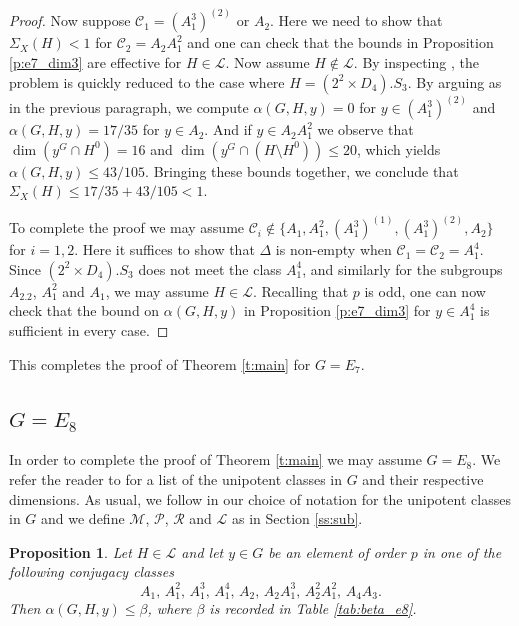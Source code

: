 \documentclass[twoside,a4paper,reqno,11pt]{amsart}
\renewcommand{\a}{\alpha}
\renewcommand{\b}{\beta}
\newcommand{\<}{\langle}
\renewcommand{\>}{\rangle}
\newcommand{\leqs}{\leqslant}
\renewcommand{\:}{\colon}
\theoremstyle{plain}
\newtheorem{prop}[thm]{Proposition}
\theoremstyle{definition}
\begin{document}
\begin{proof}
Now suppose $\mathcal{C}_1 = (A_1^3)^{(2)}$ or $A_2$. Here we need to show that 
$\Sigma_X(H)<1$ for $\mathcal{C}_2 = A_2A_1^2$ and one can check that the bounds in Proposition \ref{p:e7_dim3} are effective for $H \in \mathcal{L}$. Now assume $H \not\in \mathcal{L}$. By inspecting \cite{Law2}, the problem is quickly reduced to the case where $H = (2^2 \times D_4).S_3$. By arguing as in the previous paragraph, we compute $\a(G,H,y) = 0$ for $y \in (A_1^3)^{(2)}$ and $\a(G,H,y) = 17/35$ for $y \in A_2$. And if $y \in A_2A_1^2$ we observe that $\dim(y^G \cap H^0) = 16$ and $\dim(y^G \cap (H \setminus H^0)) \leqs 20$, which yields $\a(G,H,y) \leqs 43/105$. Bringing these bounds together, we conclude that $\Sigma_X(H) \leqs 17/35+43/105<1$.

To complete the proof we may assume $\mathcal{C}_i \not\in \{A_1,A_1^2,(A_1^3)^{(1)},(A_1^3)^{(2)},A_2\}$ for $i=1,2$. Here it suffices to show that $\Delta$ is non-empty when $\mathcal{C}_1 = \mathcal{C}_2 = A_1^4$. Since $(2^2 \times D_4).S_3$ does not meet the class $A_1^4$, and similarly for the subgroups $A_2.2$, $A_1^2$ and $A_1$, we may assume $H \in \mathcal{L}$. Recalling that $p$ is odd, one can now check that the bound on $\a(G,H,y)$ in Proposition \ref{p:e7_dim3} for $y \in A_1^4$ is sufficient in every case. 
\end{proof}

This completes the proof of Theorem \ref{t:main} for $G = E_7$.

\subsection{$G = E_8$}\label{ss:e8}

In order to complete the proof of Theorem \ref{t:main} we may assume $G = E_8$. We refer the reader to \cite[Table 22.1.1]{LS_book} for a list of the unipotent classes in $G$ and their respective dimensions. As usual, we follow \cite{LS_book} in our choice of notation for the unipotent classes in $G$ and we define $\mathcal{M}$, $\mathcal{P}$, $\mathcal{R}$ and $\mathcal{L}$ as in Section \ref{ss:sub}.

\begin{prop}\label{p:e8_dim3}
Let $H \in \mathcal{L}$ and let $y \in G$ be an element of order $p$ in one of the following conjugacy classes
\[
A_1, \, A_1^2, \, A_1^3, \, A_1^4, \, A_2, \, A_2A_1^3, \, A_2^2A_1^2, \, A_4A_3.
\]
Then $\a(G,H,y) \leqs \b$, where $\b$ is recorded in Table \ref{tab:beta_e8}.
\end{prop}
\end{document}
